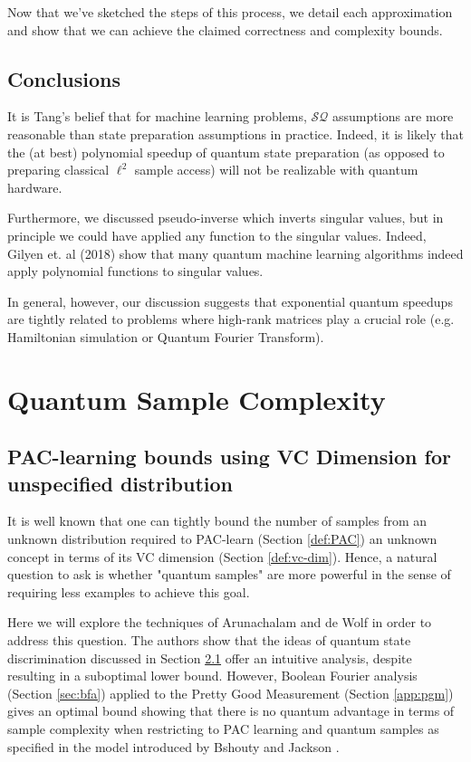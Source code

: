 \documentclass[main.tex]{subfiles}
\begin{document}
Now that we've sketched the steps of this process, we detail each approximation and show that we can achieve the claimed correctness and complexity bounds.


\section{Conclusions}

It is Tang's belief that for machine learning problems, $\mathcal{SQ}$ assumptions are more reasonable than state preparation assumptions in practice. Indeed, it is likely that the (at best) polynomial speedup of quantum state preparation (as opposed to preparing classical $\ell^2$ sample access) will not be realizable with quantum hardware.

Furthermore, we discussed pseudo-inverse which inverts singular values, but in principle we could have applied any function to the singular values. Indeed, Gilyen et. al (2018) show that many quantum machine learning algorithms indeed apply polynomial functions to singular values. 

In general, however, our discussion suggests that exponential quantum speedups are tightly related to problems where high-rank matrices play a crucial role (e.g. Hamiltonian simulation or Quantum Fourier Transform).

\chapter{Quantum Sample Complexity}

\section{PAC-learning bounds using VC Dimension for unspecified distribution}

It is well known that one can tightly bound the number of samples from an unknown distribution required to PAC-learn (Section \ref{def:PAC}) an unknown concept in terms of its VC dimension (Section \ref{def:vc-dim}). Hence, a natural question to ask is whether "quantum samples" are more powerful in the sense of requiring less examples to achieve this goal.

Here we will explore the techniques of Arunachalam and de Wolf \cite{arunachalam2016optimal} in order to address this question. The authors show that the ideas of quantum state discrimination discussed in Section \ref{} offer an intuitive analysis, despite resulting in a suboptimal lower bound. However, Boolean Fourier analysis (Section \ref{sec:bfa}) applied to the Pretty Good Measurement (Section \ref{app:pgm}) gives an optimal bound showing that there is no quantum advantage in terms of sample complexity when restricting to PAC learning and quantum samples as specified in the model introduced by Bshouty and Jackson \cite{bshouty1998learning}.
\end{document}
